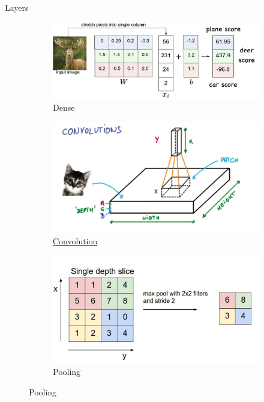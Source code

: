 \documentclass{beamer}
\begin{document}
\begin{frame}{Layers}
	\begin{figure}[htbp]
		\centering
		  
		\begin{subfigure}[b]{0.45\textwidth}
			\includegraphics[width=\textwidth]{img/clf3}
			\caption{Dense}
		\end{subfigure}
		  
		\begin{subfigure}[b]{0.45\textwidth}
			\includegraphics[width=\textwidth]{img/cnn2}
			\caption{\href{	https://bamos.github.io/data/2016-08-09/padding_strides.gif}{Convolution}}
		\end{subfigure}
		
		  
		\begin{subfigure}[b]{0.45\textwidth}
			\includegraphics[width=\textwidth]{img/pool}
			\caption{Pooling}
		\end{subfigure}
		  

\end{figure}
\end{frame}
\end{document}
